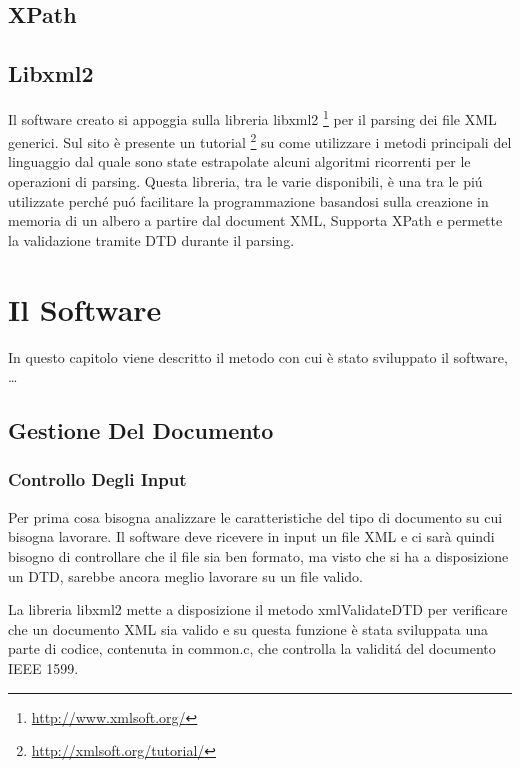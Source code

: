\documentclass[12pt,italian]{report}
\begin{document}
\section{XPath}
\label{sec:xpath}

\section{Libxml2}
\label{sec:libxml2}

Il software creato si appoggia sulla libreria libxml2 \footnote{\url{http://www.xmlsoft.org/}} per il parsing dei file XML generici. Sul sito è presente un tutorial \footnote{\url{http://xmlsoft.org/tutorial/}} su come utilizzare i metodi principali del linguaggio dal quale sono state estrapolate alcuni algoritmi ricorrenti per le operazioni di parsing.
Questa libreria, tra le varie disponibili, è una tra le piú utilizzate perché puó facilitare la programmazione basandosi sulla creazione in memoria di un albero a partire dal document XML, Supporta XPath e permette la validazione tramite DTD durante il parsing.


% 
% 

\chapter{Il Software}
\label{cap3}

In questo capitolo viene descritto il metodo con cui \`e stato sviluppato il software, \dots

\section{Gestione Del Documento}
\label{sec:gestionedeldocumento}

\subsection{Controllo Degli Input}
\label{subsec:controllodegliinput}

Per prima cosa bisogna analizzare le caratteristiche del tipo di documento su cui bisogna lavorare. Il software deve ricevere in input un file XML e ci sar\`a quindi bisogno di controllare che il file sia ben formato, ma visto che si ha a disposizione un DTD, sarebbe ancora meglio lavorare su un file valido. 

La libreria libxml2 mette a disposizione il metodo xmlValidateDTD per verificare che un documento XML sia valido e su questa funzione \`e stata sviluppata una parte di codice, contenuta in common.c, che controlla la validit\'a del documento IEEE 1599. 
\end{document}
